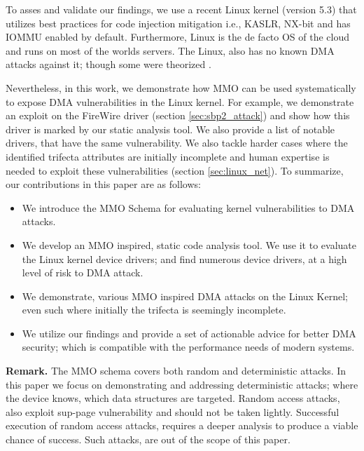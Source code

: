 To asses and validate our findings, we use a recent Linux kernel (version 5.3) that utilizes best practices for code injection mitigation i.e., KASLR, NX-bit and has IOMMU enabled by default. Furthermore, Linux is the de facto OS of the cloud and runs on most of the worlds servers. The Linux, also has no known DMA attacks against it; though some were theorized \cite{MMT16,thunder}. 

Nevertheless, in this work, we demonstrate how MMO can be used systematically to expose DMA vulnerabilities in the Linux kernel. For example, we demonstrate an exploit on the FireWire \spb driver (section \ref{sec:sbp2_attack}) and show how this driver is marked by our static analysis tool. We also provide a list of notable drivers, that have the same vulnerability. We also tackle harder cases where the identified trifecta attributes are initially incomplete and human expertise is needed to exploit these vulnerabilities (section \ref{sec:linux_net}). To summarize, our contributions in this paper are as follows:
\begin{itemize}
    \item We introduce the MMO Schema for evaluating kernel vulnerabilities to DMA attacks. 
    \item We develop an MMO inspired, static code analysis tool. We use it to evaluate the Linux kernel device drivers; and find numerous device drivers, at a high level of risk to DMA attack.
    \item We demonstrate, various MMO inspired DMA attacks on the Linux Kernel; even such where initially the trifecta is seemingly incomplete. 
    \item We utilize our findings and provide a set of actionable advice for better DMA security; which is compatible with the performance needs of modern systems.
\end{itemize}

\noindent\textbf{Remark.} The MMO schema covers both random and deterministic attacks. In this paper we focus on demonstrating and addressing deterministic attacks; where the device knows, which data structures are targeted. Random access attacks, also exploit sup-page vulnerability and should not be taken lightly. Successful execution of random access attacks, requires a deeper analysis to produce a viable chance of success. Such attacks, are out of the scope of this paper. 